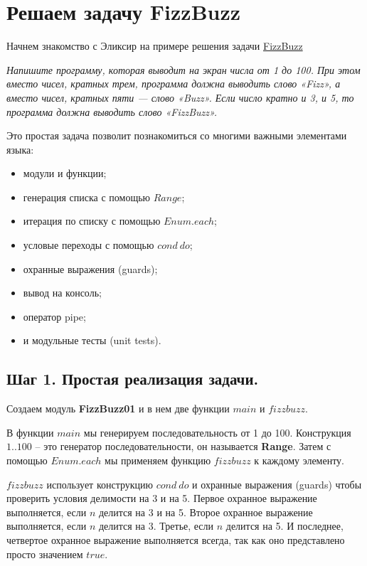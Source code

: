 \chapter{Решаем задачу FizzBuzz}

Начнем знакомство с Эликсир на примере решения задачи \href{https://ru.wikipedia.org/wiki/Fizz_buzz}{FizzBuzz}

\textit{Напишите программу, которая выводит на экран числа от 1 до 100. При этом вместо чисел, кратных трем, программа должна выводить слово «Fizz», а вместо чисел, кратных пяти — слово «Buzz». Если число кратно и 3, и 5, то программа должна выводить слово «FizzBuzz».}

Это простая задача позволит познакомиться со многими важными элементами языка:
\begin{itemize}
\item модули и функции;
\item генерация списка с помощью $Range$;
\item итерация по списку с помощью $Enum.each$;
\item условые переходы с помощью $cond\ do$;
\item охранные выражения (guards);
\item вывод на консоль;
\item оператор pipe;
\item и модульные тесты (unit tests).
\end{itemize}

\section{Шаг 1. Простая реализация задачи.}

Создаем модуль \textbf{FizzBuzz01} и в нем две функции $main$ и $fizzbuzz$.



В функции $main$ мы генерируем последовательность от 1 до 100. Конструкция $1..100$ -- это генератор последовательности, он называется \textbf{Range}. Затем с помощью $Enum.each$ мы применяем функцию $fizzbuzz$ к каждому элементу.

$fizzbuzz$ использует конструкцию $cond\ do$ и охранные выражения (guards) чтобы проверить условия делимости на 3 и на 5. Первое охранное выражение выполняется, если $n$ делится на 3 и на 5. Второе охранное выражение выполняется, если $n$ делится на 3. Третье, если $n$ делится на 5. И последнее, четвертое охранное выражение выполняется всегда, так как оно представлено просто значением $true$. 

